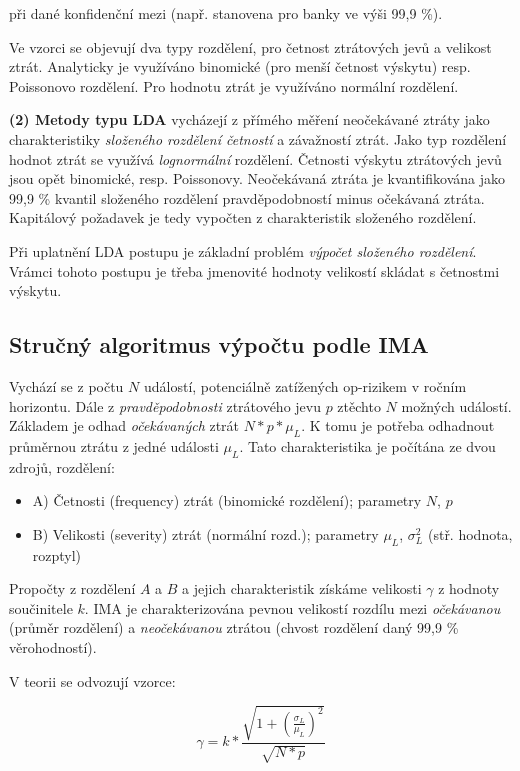 \documentclass{article}
\begin{document}
při dané konfidenční mezi (např. stanovena pro banky ve výši 99,9 \%).

Ve vzorci se objevují dva typy rozdělení, pro četnost ztrátových jevů a velikost ztrát. Analyticky je využíváno binomické (pro menší četnost výskytu) resp. Poissonovo rozdělení.  Pro hodnotu ztrát je využíváno normální rozdělení.

\textbf{(2) Metody typu LDA} vycházejí z přímého měření neočekávané ztráty jako charakteristiky \emph{složeného rozdělení četností} a závažností ztrát. Jako typ rozdělení hodnot ztrát se využívá \emph{lognormální} rozdělení. Četnosti výskytu ztrátových jevů jsou opět binomické, resp. Poissonovy. Neočekávaná ztráta je kvantifikována jako 99,9 \% kvantil složeného rozdělení pravděpodobností minus očekávaná ztráta. Kapitálový požadavek je tedy vypočten z charakteristik složeného rozdělení.

Při uplatnění LDA postupu je základní problém \emph{výpočet složeného rozdělení}. Vrámci tohoto postupu je třeba jmenovité hodnoty velikostí skládat s četnostmi výskytu.


\subsection{Stručný algoritmus výpočtu podle IMA}

Vychází se z počtu $N$ událostí, potenciálně zatížených op-rizikem v ročním horizontu. Dále z \emph{pravděpodobnosti} ztrátového jevu $p$ ztěchto $N$ možných událostí.
Základem je odhad \emph{očekávaných} ztrát $N * p * \mu_L$. K tomu je potřeba odhadnout průměrnou ztrátu z jedné události $\mu_L$. Tato charakteristika je počítána ze dvou zdrojů, rozdělení:

\begin{itemize}
  \item A) Četnosti (frequency) ztrát (binomické rozdělení); parametry $N$, $p$
  \item B) Velikosti (severity) ztrát (normální rozd.); parametry $\mu_L$, $\sigma_L^2$ (stř. hodnota, rozptyl)
\end{itemize}

Propočty z rozdělení $A$ a $B$ a jejich charakteristik získáme velikosti $\gamma$ z hodnoty součinitele $k$. IMA je charakterizována pevnou velikostí rozdílu mezi \emph{očekávanou} (průměr rozdělení) a \emph{neočekávanou} ztrátou (chvost rozdělení daný 99,9 \% věrohodností).

V teorii se odvozují vzorce:

\begin{equation}
  \gamma = k * \frac{\sqrt{1 + (\frac{\sigma_L}{\mu_L})^2}}{\sqrt{N * p}}
\end{equation}
\end{document}
